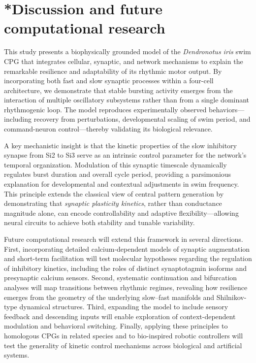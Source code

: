 \documentclass[nofootinbib,aip,amsmath,amssymb,reprint,twocolumn,10pt]{revtex4-2}
\begin{document}
\section{*Discussion and future computational research}


This study presents a biophysically grounded model of the \textit{Dendronotus iris} swim CPG that integrates cellular, synaptic, and network mechanisms to explain the remarkable resilience and adaptability of its rhythmic motor output. By incorporating both fast and slow synaptic processes within a four-cell architecture, we demonstrate that stable bursting activity emerges from the interaction of multiple oscillatory subsystems rather than from a single dominant rhythmogenic loop. The model reproduces experimentally observed behaviors—including recovery from perturbations, developmental scaling of swim period, and command-neuron control—thereby validating its biological relevance.

A key mechanistic insight is that the kinetic properties of the slow inhibitory synapse from Si2 to Si3 serve as an intrinsic control parameter for the network’s temporal organization. Modulation of this synaptic timescale dynamically regulates burst duration and overall cycle period, providing a parsimonious explanation for developmental and contextual adjustments in swim frequency. This principle extends the classical view of central pattern generation by demonstrating that \textit{synaptic plasticity kinetics}, rather than conductance magnitude alone, can encode controllability and adaptive flexibility—allowing neural circuits to achieve both stability and tunable variability.

Future computational research will extend this framework in several directions. First, incorporating detailed calcium-dependent models of synaptic augmentation and short-term facilitation will test molecular hypotheses regarding the regulation of inhibitory kinetics, including the roles of distinct synaptotagmin isoforms and presynaptic calcium sensors. Second, systematic continuation and bifurcation analyses will map transitions between rhythmic regimes, revealing how resilience emerges from the geometry of the underlying slow–fast manifolds and Shilnikov-type dynamical structures. Third, expanding the model to include sensory feedback and descending inputs will enable exploration of context-dependent modulation and behavioral switching. Finally, applying these principles to homologous CPGs in related species and to bio-inspired robotic controllers will test the generality of kinetic control mechanisms across biological and artificial systems.
\end{document}
